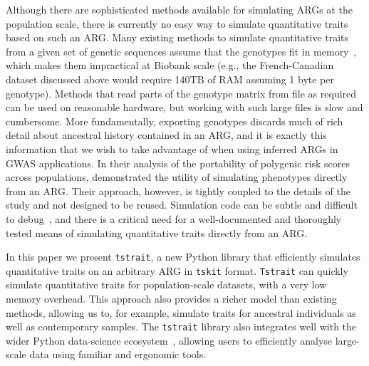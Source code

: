 \documentclass[unnumsec,webpdf,modern,large,namedate]{oup-authoring-template}%
\begin{document}
Although there are sophisticated methods available for simulating
ARGs at the population scale, there is currently no
easy way to simulate quantitative traits based on such an ARG.
Many existing methods to simulate quantitative traits from a given set of
genetic sequences assume that the genotypes fit in
memory~\citep[e.g.][]{meyer2018,fernandes2020}, which makes them
impractical at Biobank scale (e.g., the French-Canadian dataset discussed
above would require 140TB of RAM assuming 1 byte per genotype).
Methods that read parts of the genotype matrix from file as
required~\citep[e.g.][]{wharrie2023hapnest} can be used on
reasonable hardware, but working with such large files is slow
and cumbersome.
More fundamentally, exporting genotypes discards much of rich
detail about ancestral history contained in an ARG, and
it is exactly this information that we wish to take
advantage of when using inferred ARGs in GWAS applications.
In their analysis of the portability of polygenic risk
scores across populations, \citet{martin2017}
demonstrated the utility of simulating phenotypes directly
from an ARG. Their approach, however, is tightly coupled to the details
of the study and not designed to be reused.
Simulation code can be subtle and difficult to
debug~\citep{ragsdale2020lessons}, and there
is a critical need for a well-documented and
thoroughly tested means of simulating quantitative
traits directly from an ARG.

In this paper we present \texttt{tstrait}, a new Python library that
efficiently simulates quantitative traits on an arbitrary ARG
in \texttt{tskit} format.
\texttt{Tstrait} can
quickly simulate quantitative traits for population-scale datasets,
with a very low memory overhead. This approach also provides a
richer model than existing methods,
allowing us to, for example, simulate traits for
ancestral individuals as well as contemporary samples.
The \texttt{tstrait} library also integrates well with the wider
Python data-science ecosystem~\citep{numpy},
allowing users to efficiently analyse
large-scale data using familiar and ergonomic tools.
\end{document}
